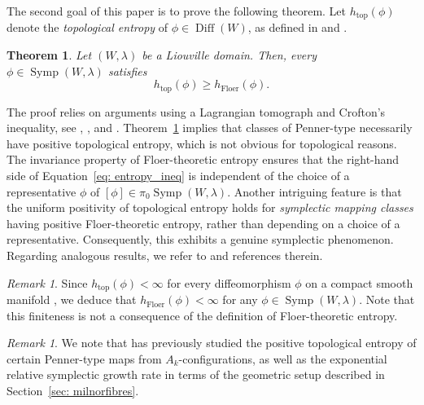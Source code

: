 \documentclass[12pt]{article}
\renewcommand{\ge}{\geqslant}
\theoremstyle{theorem}
\newtheorem{TheoremA}{Theorem}
\theoremstyle{definition}
\theoremstyle{remark}
\newtheorem{remark}[theorem]{Remark}
\numberwithin{equation}{section}
\DeclareMathOperator{\floer}{Floer}
\DeclareMathOperator{\topo}{top}
\DeclareMathOperator{\Diff}{Diff}
\DeclareMathOperator{\Symp}{Symp}
\begin{document}
The second goal of this paper is to prove the following theorem.
Let $h_{\topo}(\phi)$ denote the \emph{topological entropy} of $\phi\in\Diff(W)$, as defined in \cite[Definition~3.1.3]{KaHa95} and \cite[Section A.2]{AbAlSaSc23}.
\begin{TheoremA}\label{thm: mainthmB}
Let $(W,\lambda)$ be a Liouville domain.
Then, every $\phi\in \Symp(W,\lambda)$ satisfies
\begin{equation}\label{eq: entropy_ineq}
h_{\topo}(\phi)\ge h_{\floer}(\phi).	
\end{equation}
\end{TheoremA}
The proof relies on arguments using a Lagrangian tomograph and Crofton's inequality, see \cite[Section~5.2]{CiGiGu21}, \cite[Section~3]{BaLe25}, and  \cite[Section~4.3]{KiKw26}.
Theorem~\ref{thm: mainthmB} implies that classes of Penner-type necessarily have positive topological entropy, which is not obvious for topological reasons.
The invariance property of Floer-theoretic entropy ensures that the right-hand side of Equation~\ref{eq: entropy_ineq} is independent of the choice of a representative $\phi$ of $[\phi]\in\pi_0\Symp(W,\lambda)$.
Another intriguing feature is that the uniform positivity of topological entropy holds for \emph{symplectic mapping classes} having positive Floer-theoretic entropy, rather than depending on a choice of a representative. 
Consequently, this exhibits a genuine symplectic phenomenon.
Regarding analogous results, we refer to \cite{Po02,FrSc05,KKL18,AlMe19,Da20} and references therein.
\begin{remark}\label{rem: intro}
Since $h_{\topo}(\phi)<\infty$ for every diffeomorphism $\phi$ on a compact smooth manifold \cite[Corollary~3.2.10]{KaHa95}, we deduce that $h_{\floer}(\phi)<\infty$ for any $\phi\in\Symp(W,\lambda)$.
Note that this finiteness is not a consequence of the definition of Floer-theoretic entropy.
\end{remark}
\begin{remark}
We note that \cite{GWX26} has previously studied the positive topological entropy of certain Penner-type maps from $A_k$-configurations, as well as the exponential relative symplectic growth rate in terms of the geometric setup described in Section~\ref{sec: milnorfibres}.
\end{remark}
\end{document}
